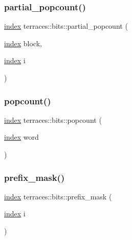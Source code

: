 \subsubsection{\texorpdfstring{partial\+\_\+popcount()}{partial\_popcount()}}
{\footnotesize\ttfamily \hyperlink{namespaceterraces_adbc33ccb543d1634e96d0eb02e472c77}{index} terraces\+::bits\+::partial\+\_\+popcount (\begin{DoxyParamCaption}\item[{\hyperlink{namespaceterraces_adbc33ccb543d1634e96d0eb02e472c77}{index}}]{block,  }\item[{\hyperlink{namespaceterraces_adbc33ccb543d1634e96d0eb02e472c77}{index}}]{i }\end{DoxyParamCaption})\hspace{0.3cm}{\ttfamily [inline]}}

\mbox{\label{namespaceterraces_1_1bits_a3e8ce4c31cfec4642945190c2a364321}} 
\subsubsection{\texorpdfstring{popcount()}{popcount()}}
{\footnotesize\ttfamily \hyperlink{namespaceterraces_adbc33ccb543d1634e96d0eb02e472c77}{index} terraces\+::bits\+::popcount (\begin{DoxyParamCaption}\item[{\hyperlink{namespaceterraces_adbc33ccb543d1634e96d0eb02e472c77}{index}}]{word }\end{DoxyParamCaption})\hspace{0.3cm}{\ttfamily [inline]}}

\mbox{\label{namespaceterraces_1_1bits_a82c0d409c7b68413f6063811735de7b6}} 
\subsubsection{\texorpdfstring{prefix\+\_\+mask()}{prefix\_mask()}}
{\footnotesize\ttfamily \hyperlink{namespaceterraces_adbc33ccb543d1634e96d0eb02e472c77}{index} terraces\+::bits\+::prefix\+\_\+mask (\begin{DoxyParamCaption}\item[{\hyperlink{namespaceterraces_adbc33ccb543d1634e96d0eb02e472c77}{index}}]{i }\end{DoxyParamCaption})\hspace{0.3cm}{\ttfamily [inline]}}

